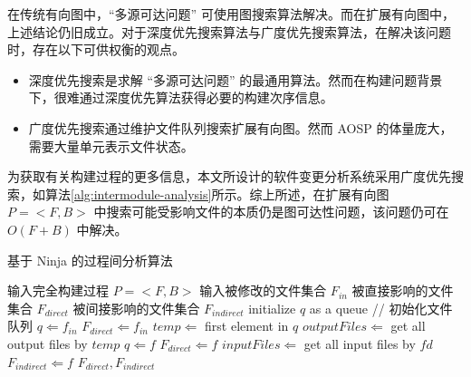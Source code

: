 在传统有向图中，“多源可达问题” 可使用图搜索算法解决。而在扩展有向图中，上述结论仍旧成立。对于深度优先搜索算法与广度优先搜索算法，在解决该问题时，存在以下可供权衡的观点。

\begin{itemize}
    \item 深度优先搜索是求解 “多源可达问题” 的最通用算法。然而在构建问题背景下，很难通过深度优先算法获得必要的构建次序信息。
    \item 广度优先搜索通过维护文件队列搜索扩展有向图。然而 AOSP 的体量庞大，需要大量单元表示文件状态。
\end{itemize}

为获取有关构建过程的更多信息，本文所设计的软件变更分析系统采用广度优先搜索，如算法\ref{alg:intermodule-analysis}所示。综上所述，在扩展有向图 $P = <F, B>$ 中搜索可能受影响文件的本质仍是图可达性问题，该问题仍可在 $O(F + B)$ 中解决。\cite{GRAPHREACHABILITY}

\renewcommand{\thealgorithm}{4}
    \begin{algorithm}
        \caption{基于 Ninja 的过程间分析算法}
        \begin{algorithmic}[1]
            \Require 输入完全构建过程 $P = <F, B>$
            \Require 输入被修改的文件集合 $F_{in}$
            \Ensure 被直接影响的文件集合 $F_{direct}$
            \Ensure 被间接影响的文件集合 $F_{indirect}$
            \State initialize $q$ as a queue // 初始化文件队列
                \State $q \Leftarrow f_{in}$
                \State $F_{direct} \Leftarrow f_{in}$
            \EndFor
                \State $temp \Leftarrow$ first element in $q$
                \State $outputFiles \Leftarrow$ get all output files by $temp$
                        \State $q \Leftarrow f$
                        \State $F_{direct} \Leftarrow f$
                    \EndIf
                \EndFor
            \EndWhile
                \State $inputFiles \Leftarrow$ get all input files by $fd$
                        \State $F_{indirect} \Leftarrow f$
                    \EndIf
                \EndFor
            \EndFor
            \State \Return $F_{direct}, F_{indirect}$
        \end{algorithmic}
        \label{alg:intermodule-analysis}
    \end{algorithm}
